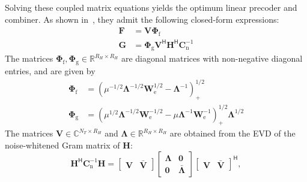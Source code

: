 Solving these coupled matrix equations yields the optimum linear precoder and combiner.
As shown in~\cite{su_mimo_joint_precoder_decoder_design}, they admit the following closed-form expressions:
\begin{subequations}
\label{eq:solution_generalized_design}
\begin{align}
    \mathbf{F} &= \mathbf{V} \mathbf{\Phi}_{\mathrm{f}} \label{eq:solution_generalized_design_precoder}\\
    \mathbf{G} &= \mathbf{\Phi}_{\mathrm{g}} \mathbf{V}^{\mathsf{H}} \mathbf{H}^{\mathsf{H}} \mathbf{C}^{-1}_{\mathrm{n}} \label{eq:solution_generalized_design_combiner}
\end{align}
\end{subequations}
The matrices $\mathbf{\Phi}_{\mathrm{f}}, \mathbf{\Phi}_{\mathrm{g}} \in \mathbb{R}^{R_H \times R_H}$ are diagonal matrices with non-negative diagonal entries, and are given by
\begin{subequations}
\label{eq:solution_generalized_design_phi}
\begin{align}
    \mathbf{\Phi}_{\mathrm{f}} &= (\mu^{-1/2} \mathbf{\Lambda}^{-1/2} \mathbf{W}^{1/2}_{\mathrm{e}} - \mathbf{\Lambda}^{-1})^{1/2}_{+} \label{eq:solution_generalized_design_precoder_phi}\\
    \mathbf{\Phi}_{\mathrm{g}} &= (\mu^{1/2} \mathbf{\Lambda}^{-1/2} \mathbf{W}^{-1/2}_{\mathrm{e}} - \mu \mathbf{\Lambda}^{-1} \mathbf{W}^{-1}_{\mathrm{e}})^{1/2}_{+} \mathbf{\Lambda}^{1/2} \label{eq:solution_generalized_design_combiner_phi}
\end{align}
\end{subequations}
The matrices $\mathbf{V} \in \mathbb{C}^{N_T \times R_H}$ and $\mathbf{\Lambda} \in \mathbb{R}^{R_H \times R_H}$ are obtained from the \ac{EVD} of the noise-whitened Gram matrix of $\mathbf{H}$:
\begin{equation}
\label{eq:evd_generalized_design}
    \mathbf{H}^{\mathsf{H}} \mathbf{C}^{-1}_{\mathrm{n}} \mathbf{H} = \begin{bmatrix} \mathbf{V} & \bar{\mathbf{V}} \end{bmatrix} \begin{bmatrix} \mathbf{\Lambda} & \mathbf{0} \\ \mathbf{0} & \bar{\mathbf{\Lambda}} \end{bmatrix} \begin{bmatrix} \mathbf{V} & \bar{\mathbf{V}} \end{bmatrix}^{\mathsf{H}},
\end{equation}
